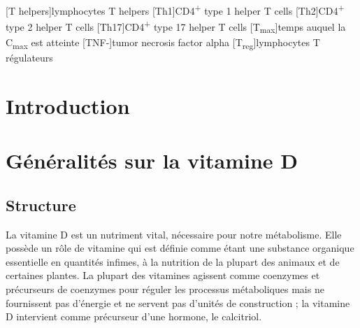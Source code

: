 \documentclass[
  a4paper,
  DIV=11,
  numbers=noendperiod,
  listof=totoc]{scrreprt}
\begin{document}
\begin{acronym}
[T helpers]{lymphocytes T helpers}
[Th1]{CD4\textsuperscript{+} type 1 helper T cells}
[Th2]{CD4\textsuperscript{+} type 2 helper T cells}
[Th17]{CD4\textsuperscript{+} type 17 helper T cells}
[T\textsubscript{max}]{temps auquel la C\textsubscript{max} est atteinte}
[TNF-\mupalpha]{tumor necrosis factor alpha}
[T\textsubscript{reg}]{lymphocytes T régulateurs}
\end{acronym}

\newpage{}


\chapter{Introduction}\label{introduction}

\newpage{}

\chapter{Généralités sur la vitamine
D}\label{guxe9nuxe9ralituxe9s-sur-la-vitamine-d}

\section{Structure}\label{structure}

La vitamine D est un nutriment vital, nécessaire pour notre métabolisme.
Elle possède un rôle de vitamine qui est définie comme étant une
substance organique essentielle en quantités infimes, à la nutrition de
la plupart des animaux et de certaines plantes. La plupart des vitamines
agissent comme coenzymes et précurseurs de coenzymes pour réguler les
processus métaboliques mais ne fournissent pas d'énergie et ne servent
pas d'unités de construction \autocite{Ellison.2021} ; la vitamine D
intervient comme précurseur d'une hormone, le calcitriol.
\end{document}

